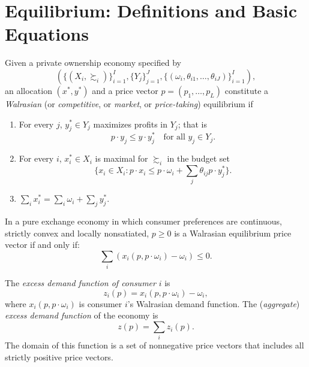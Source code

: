 \addtocounter{section}{1}

\section{Equilibrium: Definitions and Basic Equations}

\begin{defn}
    Given a private ownership economy specified by
    \begin{equation*}
        \left(\{(X_i, \succsim_i)\}_{i = 1}^I, \{Y_j\}_{j = 1}^J, \{(\omega_i, \theta_{i1}, \dots, \theta_{iJ})\}_{i = 1}^I\right),
    \end{equation*}
    an allocation $(x^*, y^*)$ and a price vector $p = (p_1, \dots, p_L)$ constitute a \emph{Walrasian} (or \emph{competitive}, or \emph{market}, or \emph{price-taking}) equilibrium if
    \begin{enumerate}
        \item
        For every $j$, $y^*_j \in Y_j$ maximizes profits in $Y_j$; that is
        \begin{equation*}
            p \cdot y_j \leq y \cdot y^*_j \quad \text{for all } y_j \in Y_j.
        \end{equation*}

        \item 
        For every $i$, $x^*_i \in X_i$ is maximal for $\succsim_i$ in the budget set
        \begin{equation*}
            \{x_i \in X_i: p \cdot x_i \leq p \cdot \omega_i + \sum_j \theta_{ij} p \cdot y^*_j \}.
        \end{equation*}

        \item $\sum_i x^*_i = \sum_i \omega_i + \sum_j y^*_j$.
    \end{enumerate}
\end{defn}

\begin{prop}
    In a pure exchange economy in which consumer preferences are continuous, strictly convex and locally nonsatiated, $p \geq 0$ is a Walrasian equilibrium price vector if and only if:
    \begin{equation*}
        \sum_i \left(x_i(p, p \cdot \omega_i) - \omega_i \right) \leq 0.
    \end{equation*}
\end{prop}

\begin{defn}
    The \emph{excess demand function of consumer} $i$ is 
    \begin{equation*}
        z_i(p) = x_i(p, p \cdot \omega_i) - \omega_i,
    \end{equation*}
    where $x_i(p, p \cdot \omega_i)$  is consumer $i$'s Walrasian demand function. The (\emph{aggregate}) \emph{excess demand function} of the economy is
    \begin{equation*}
        z(p) = \sum_i z_i(p).
    \end{equation*}
    The domain of this function is a set of nonnegative price vectors that includes all strictly positive price vectors.
\end{defn}

